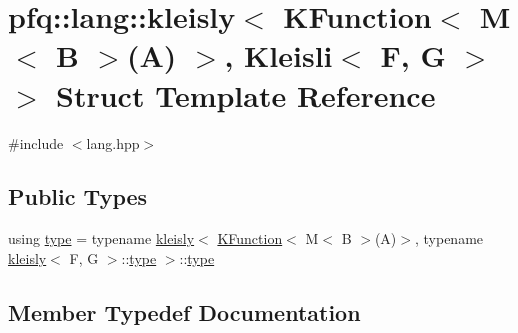 \hypertarget{structpfq_1_1lang_1_1kleisly_3_01KFunction_3_01M_3_01B_01_4_07A_08_01_4_00_01Kleisli_3_01F_00_01G_01_4_01_4}{}\section{pfq\+:\+:lang\+:\+:kleisly$<$ K\+Function$<$ M$<$ B $>$(A) $>$, Kleisli$<$ F, G $>$ $>$ Struct Template Reference}
\label{structpfq_1_1lang_1_1kleisly_3_01KFunction_3_01M_3_01B_01_4_07A_08_01_4_00_01Kleisli_3_01F_00_01G_01_4_01_4}


{\ttfamily \#include $<$lang.\+hpp$>$}

\subsection*{Public Types}
\begin{DoxyCompactItemize}
\item 
using \hyperlink{structpfq_1_1lang_1_1kleisly_3_01KFunction_3_01M_3_01B_01_4_07A_08_01_4_00_01Kleisli_3_01F_00_01G_01_4_01_4_a0d400d4878fb63c2dd734b642e395020}{type} = typename \hyperlink{structpfq_1_1lang_1_1kleisly}{kleisly}$<$ \hyperlink{structpfq_1_1lang_1_1KFunction}{K\+Function}$<$ M$<$ B $>$(A)$>$, typename \hyperlink{structpfq_1_1lang_1_1kleisly}{kleisly}$<$ F, G $>$\+::\hyperlink{structpfq_1_1lang_1_1kleisly_3_01KFunction_3_01M_3_01B_01_4_07A_08_01_4_00_01Kleisli_3_01F_00_01G_01_4_01_4_a0d400d4878fb63c2dd734b642e395020}{type} $>$\+::\hyperlink{structpfq_1_1lang_1_1kleisly_3_01KFunction_3_01M_3_01B_01_4_07A_08_01_4_00_01Kleisli_3_01F_00_01G_01_4_01_4_a0d400d4878fb63c2dd734b642e395020}{type}
\end{DoxyCompactItemize}


\subsection{Member Typedef Documentation}
\mbox{\label{structpfq_1_1lang_1_1kleisly_3_01KFunction_3_01M_3_01B_01_4_07A_08_01_4_00_01Kleisli_3_01F_00_01G_01_4_01_4_a0d400d4878fb63c2dd734b642e395020}} 

